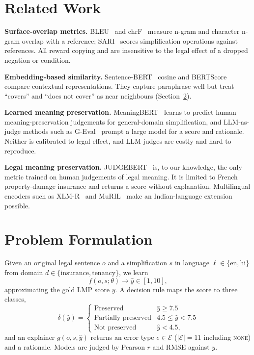 \section{Related Work}
\textbf{Surface-overlap metrics.} BLEU~\cite{bleu} and chrF~\cite{chrf} measure n-gram and character n-gram overlap with a reference; SARI~\cite{sari} scores simplification operations against references. All reward copying and are insensitive to the legal effect of a dropped negation or condition.

\textbf{Embedding-based similarity.} Sentence-BERT~\cite{sbert} cosine and BERTScore~\cite{bertscore} compare contextual representations. They capture paraphrase well but treat ``covers'' and ``does not cover'' as near neighbours (Section~\ref{sec:motivation}).

\textbf{Learned meaning preservation.} MeaningBERT~\cite{meaningbert} learns to predict human meaning-preservation judgements for general-domain simplification, and LLM-as-judge methods such as G-Eval~\cite{geval} prompt a large model for a score and rationale. Neither is calibrated to legal effect, and LLM judges are costly and hard to reproduce.

\textbf{Legal meaning preservation.} JUDGEBERT~\cite{judgebert} is, to our knowledge, the only metric trained on human judgements of legal meaning. It is limited to French property-damage insurance and returns a score without explanation. Multilingual encoders such as XLM-R~\cite{xlmr} and MuRIL~\cite{muril} make an Indian-language extension possible.

\section{Problem Formulation}\label{sec:motivation}
Given an original legal sentence $o$ and a simplification $s$ in language $\ell\in\{\text{en},\text{hi}\}$ from domain $d\in\{\text{insurance},\text{tenancy}\}$, we learn
\begin{equation}
f(o,s;\theta)\rightarrow \hat{y}\in[1,10],
\end{equation}
approximating the gold LMP score $y$. A decision rule maps the score to three classes,
\begin{equation}
\delta(\hat{y})=\begin{cases}\text{Preserved} & \hat{y}\ge 7.5\\ \text{Partially preserved} & 4.5\le\hat{y}<7.5\\ \text{Not preserved} & \hat{y}<4.5,\end{cases}
\end{equation}
and an explainer $g(o,s,\hat{y})$ returns an error type $e\in\mathcal{E}$ ($|\mathcal{E}|=11$ including \textsc{none}) and a rationale. Models are judged by Pearson $r$ and RMSE against $y$.

